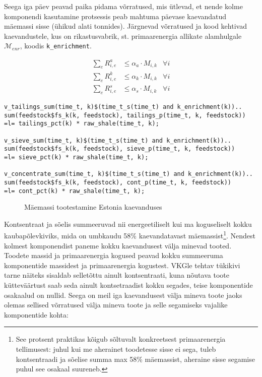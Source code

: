 \documentclass[10pt,a4paper]{article}
\begin{document}
Seega iga päev peavad paika pidama võrratused, mis ütlevad, et nende kolme komponendi kasutamine protsessis peab mahtuma päevase kaevandatud mäemassi sisse (ühikud alati tonnides). Järgnevad võrratused ja kood kehtivad kaevandustele, kus on rikastusvabrik, st. primaarenergia allikate alamhulgale $\mathcal{M}_{enr}$, koodis \texttt{k\_enrichment}.

\begin{align}
\sum_e R^a_{i,e} &\le \mathit{\alpha_a} \cdot M_{i,k} & \forall i \\
\sum_e R^k_{i,e} &\le \mathit{\alpha_k} \cdot M_{i,k} & \forall i \\
\sum_e R^s_{i,e} &\le \mathit{\alpha_s}  \cdot M_{i,k} & \forall i  
\end{align}
\begin{verbatim}
v_tailings_sum(time_t, k)$(time_t_s(time_t) and k_enrichment(k))..
sum(feedstock$fs_k(k, feedstock), tailings_p(time_t, k, feedstock))
=l= tailings_pct(k) * raw_shale(time_t, k);

v_sieve_sum(time_t, k)$(time_t_s(time_t) and k_enrichment(k))..
sum(feedstock$fs_k(k, feedstock), sieve_p(time_t, k, feedstock))
=l= sieve_pct(k) * raw_shale(time_t, k);

v_concentrate_sum(time_t, k)$(time_t_s(time_t) and k_enrichment(k))..
sum(feedstock$fs_k(k, feedstock), cont_p(time_t, k, feedstock))
=l= cont_pct(k) * raw_shale(time_t, k);
\end{verbatim}

\begin{figure}

\caption{Mäemassi tootestamine Estonia kaevanduses
\label{joon2}}
\end{figure}


Kontsentraat ja sõelis summeeruvad nii energeetiliselt kui ma koguseliselt kokku kaubapõlevkiviks, mida on umbkaudu 58\% kaevandatavast mäemassist\footnote{See protsent praktikas kõigub sõltuvalt konkreetsest primaarenergia tellimusest: juhul kui me aherainet toodetesse sisse ei sega, tuleb kontsentraadi ja sõelise summa max 58\% mäemassist, aheraine sisse segamise puhul see osakaal suureneb.}. Nendest kolmest komponendist paneme kokku kaevandusest välja minevad tooted. Toodete massid ja primaarenergia kogused peavad kokku summeeruma komponentide massidest ja primaarenergia kogustest. VKGle tehtav tükikivi tarne näiteks sisaldab selletõttu ainult kontsentraati, kuna nõutava toote kütteväärtust saab seda ainult kontsetraadist kokku segades, teise komponentide osakaalud on nullid. Seega on meil iga kaevandusest välja mineva toote jaoks olemas sellised võrratused välja mineva toote ja selle segamiseks vajalike komponentide kohta:
\end{document}
